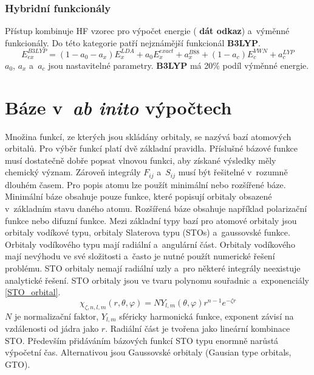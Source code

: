 \documentclass[
  printed, %
  table,   %
  lof,     %
  lot,     %
  oneside,
]{fithesis3}
\begin{document}
\subsubsection{Hybridní funkcionály}
Přístup kombinuje HF vzorec pro výpočet energie ( \textbf{dát odkaz}) a~výměnné funkcionály. 
Do této kategorie patří nejznámější funkcionál \textbf{B3LYP}.
\begin{equation}
E_{ex}^{B3LYP} = (1-a_0-a_x)E_x^{LDA} + a_0E_x^{exact} + a_x^{B88} + (1-a_c)E_c^{VWN} + a_c^{LYP}
\label{B3LYP_rovnice}
\end{equation}
$a_0$, $a_x$ a~$a_c$ jsou nastavitelné parametry. \textbf{B3LYP} má 20\% podíl výměnné energie. \cite{dftshrnutivysledky}

\section{Báze v~\textit{ab inito} výpočtech }\label{kapitola_baze}
Množina funkcí, ze kterých jsou skládány orbitaly, se nazývá bazí atomových orbitalů. Pro výběr funkcí platí dvě základní pravidla. Příslušné bázové funkce musí dostatečně dobře popsat vlnovou funkci, aby získané výsledky měly chemický význam. Zároveň integrály $F_{ij}$ a~$S_{ij}$ musí být řešitelné v~rozumně dlouhém časem. \cite{lowe2011quantum}
Pro popis atomu lze použít minimální nebo rozšířené báze. Minimální báze obsahuje pouze funkce, které popisují orbitaly obsazené v~základním stavu daného atomu. Rozšířená báze obsahuje například polarizační funkce nebo difuzní funkce. Mezi základní typy bazí pro atomové orbitaly jsou orbitaly vodíkové typu, orbitaly Slaterova typu (STOs) a~gaussovské funkce. \cite{dftshrnutivysledky}
Orbitaly vodíkového typu mají radiální a~angulární část. Orbitaly vodíkového mají nevýhodu ve své složitosti a~často je nutné použít numerické řešení problému. STO orbitaly nemají radiální uzly a~pro některé integrály neexistuje analytické řešení. STO orbitaly jsou ve tvaru polynomu souřadnic a~exponenciály \ref{STO_orbital}.\cite{jensen2007introduction}
\begin{equation}
\chi_{\zeta, n, l, m}(r, \theta, \varphi) = NY_{l,m} (\theta, \varphi) r^{n-1} e^{-\zeta r}
\label{STO_orbital} 
\end{equation}
$N$ je normalizační faktor, $Y_{l,m}$ sféricky harmonická funkce, exponent závisí na vzdálenosti od jádra jako $r$. Radiální část je tvořena jako lineární kombinace STO. Především přidáváním bázových funkcí STO typu enormně narůstá výpočetní čas. Alternativou jsou Gaussovské orbitaly (Gausian type orbitals, GTO).
\end{document}

